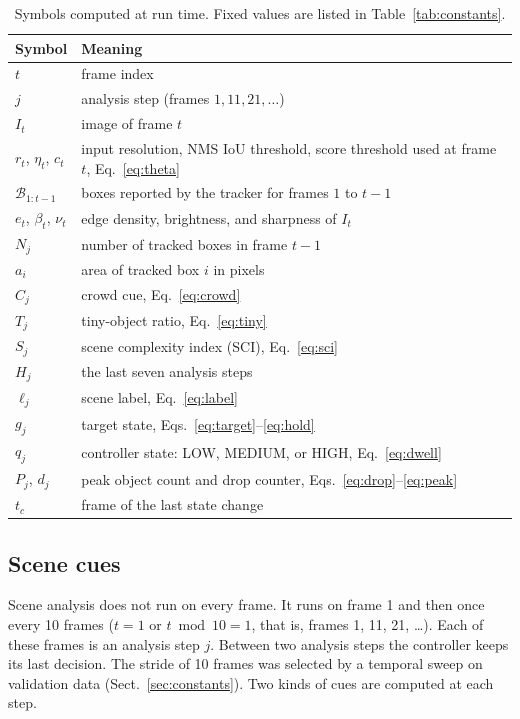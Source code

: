 \documentclass[pdflatex,sn-mathphys-num,iicol]{sn-jnl}
\begin{document}
\begin{table}[t]
\caption{Symbols computed at run time. Fixed values are listed in
Table~\ref{tab:constants}.}
\label{tab:symbols}
\centering\footnotesize
\setlength{\tabcolsep}{4pt}
\begin{tabular}{@{}l>{\raggedright\arraybackslash}p{55mm}@{}}
\toprule
Symbol & Meaning\\
\midrule
$t$ & frame index\\
$j$ & analysis step (frames $1, 11, 21, \dots$)\\
$I_t$ & image of frame $t$\\
$r_t$, $\eta_t$, $c_t$ & input resolution, NMS IoU threshold, score threshold
  used at frame $t$, Eq.~\eqref{eq:theta}\\
$\mathcal{B}_{1:t-1}$ & boxes reported by the tracker for frames $1$ to $t-1$\\
$e_t$, $\beta_t$, $\nu_t$ & edge density, brightness, and sharpness of $I_t$\\
$N_j$ & number of tracked boxes in frame $t-1$\\
$a_i$ & area of tracked box $i$ in pixels\\
$C_j$ & crowd cue, Eq.~\eqref{eq:crowd}\\
$T_j$ & tiny-object ratio, Eq.~\eqref{eq:tiny}\\
$S_j$ & scene complexity index (SCI), Eq.~\eqref{eq:sci}\\
$H_j$ & the last seven analysis steps\\
$\ell_j$ & scene label, Eq.~\eqref{eq:label}\\
$g_j$ & target state, Eqs.~\eqref{eq:target}--\eqref{eq:hold}\\
$q_j$ & controller state: LOW, MEDIUM, or HIGH, Eq.~\eqref{eq:dwell}\\
$P_j$, $d_j$ & peak object count and drop counter,
  Eqs.~\eqref{eq:drop}--\eqref{eq:peak}\\
$t_c$ & frame of the last state change\\
\bottomrule
\end{tabular}
\end{table}

\subsection{Scene cues}
Scene analysis does not run on every frame. It runs on frame 1 and then once
every 10 frames ($t=1$ or $t \bmod 10 = 1$, that is, frames 1, 11, 21,
\dots). Each of these frames is an analysis step $j$. Between two analysis
steps the controller keeps its last decision. The stride of 10 frames was
selected by a temporal sweep on validation data (Sect.~\ref{sec:constants}).
Two kinds of cues are computed at each step.
\end{document}
